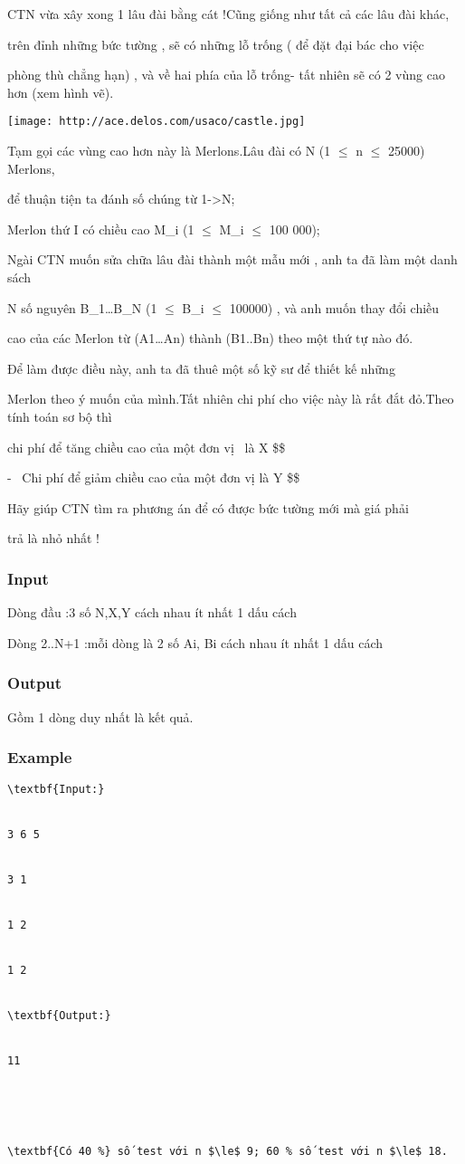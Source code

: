 



   CTN vừa xây xong 1 lâu đài bằng cát !Cũng giống như tất cả các lâu đài khác,  

   trên đỉnh những bức tường , sẽ có những lỗ trống ( để đặt đại bác cho việc  

   phòng thù chẳng hạn) , và về hai phía của lỗ trống- tất nhiên sẽ có 2 vùng cao hơn (xem hình vẽ).  


\texttt{[image: http://ace.delos.com/usaco/castle.jpg]}

   Tạm gọi các vùng cao hơn này là Merlons.Lâu đài có N (1 $\le$ n $\le$ 25000) Merlons,  

   để thuận tiện ta đánh số chúng từ 1->N;  

   Merlon thứ I có chiều cao M\_i (1 $\le$ M\_i $\le$ 100 000);  

   Ngài CTN muốn sửa chữa lâu đài thành một mẫu mới , anh ta đã làm một danh sách  

   N số nguyên B\_1…B\_N (1 $\le$ B\_i $\le$ 100000) , và anh muốn thay đổi chiều  

   cao của các Merlon từ (A1…An) thành (B1..Bn) theo một thứ tự nào đó.  



   Để làm được điều này, anh ta đã thuê một số kỹ sư để thiết kế những  

   Merlon theo ý muốn của mình.Tất nhiên chi phí cho việc này là rất đắt đỏ.Theo tính toán sơ bộ thì  

   chi phí để tăng chiều cao của một đơn vị  là X \$\$  

   -  Chi phí để giảm chiều cao của một đơn vị là Y \$\$  

   Hãy giúp CTN tìm ra phương án để có được bức tường mới mà giá phải  

   trả là nhỏ nhất !  

\subsubsection{   Input  }

   Dòng đầu :3 số N,X,Y cách nhau ít nhất 1 dấu cách  

   Dòng 2..N+1 :mỗi dòng là 2 số Ai, Bi cách nhau ít nhất 1 dấu cách  

\subsubsection{   Output  }

   Gồm 1 dòng duy nhất là kết quả.  

\subsubsection{   Example  }
\begin{verbatim}
\textbf{Input:}


3 6 5


3 1


1 2


1 2


\textbf{Output:}


11





\textbf{Có 40 %} số test với n $\le$ 9; 60 % số test với n $\le$ 18.


\end{verbatim}
